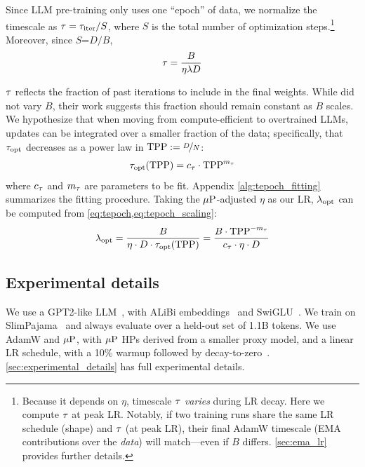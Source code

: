 Since LLM pre-training only uses one ``epoch'' of data, we normalize
the timescale as $\tau = {\tau_\text{iter}}/{S}$, where $S$ is the total
number of optimization steps.\footnote{Because it depends on $\eta$,
timescale $\tau$ \emph{varies} during LR decay. Here we compute
$\tau$ at peak LR\@. Notably, if two training runs share the same
LR schedule (shape) and $\tau$ (at peak LR), their final AdamW
timescale (EMA contributions over the \emph{data}) will match---even
if $B$ differs. \cref{sec:ema_lr} provides further details.}
%
Moreover, since $S$=${D}/{B}$,
\begin{equation}\label{eq:tepoch}
  \tau = \frac{B}{\eta\lambda D}
\end{equation}

$\tau$ reflects the fraction of past iterations to include in the
final weights.
%
While \citet{wang2024how} did not vary $B$, their work suggests this
fraction should remain constant as $B$ scales.
%
We hypothesize that when moving from compute-efficient to overtrained
LLMs, updates can be integrated over a smaller fraction of the data;
specifically, that ${\tau}_{\text{opt}}$ decreases as a power law in $\mathrm{TPP} :=
\nicefrac{D}{N}$:
\begin{equation}\label{eq:tepoch_scaling}
  {\tau}_{\text{opt}}(\mathrm{TPP}) = c_{\tau} \cdot \mathrm{TPP}^{m_{\tau}}
\end{equation}
where $c_{\tau}$ and $m_{\tau}$ are parameters to be fit.
%
%
Appendix \cref{alg:tepoch_fitting} summarizes the fitting procedure.
%
%
Taking the $\mbox{$\mu$P}$-adjusted $\eta$ as our LR, $\lambda_{\text{opt}}$ can be
computed from \cref{eq:tepoch,eq:tepoch_scaling}:
\begin{equation}\label{eq:lambdaopt}
   \lambda_{\text{opt}} = \frac{B}{\eta \cdot D \cdot {\tau}_{\text{opt}}(\mathrm{TPP})}
              = \frac{B \cdot \mathrm{TPP}^{-m_{\tau}}}{c_{\tau} \cdot \eta \cdot D}
\end{equation}

\subsection{Experimental details}\label{sec:lambda_experimental}

We use a GPT2-like LLM~\citep{radford2019gpt2}, with ALiBi
embeddings~\citep{press2022alibi} and SwiGLU~\citep{shazeer2020glu}.
%
We train on SlimPajama~\citep{cerebras2023slimpajama} and always
evaluate over a held-out set of 1.1B tokens.
%
We use AdamW and $\mbox{$\mu$P}$, with $\mbox{$\mu$P}$ HPs derived from a smaller proxy
model, and a linear LR schedule, with a 10\% warmup followed by
decay-to-zero~\citep{bergsma2025straight}.
%
\cref{sec:experimental_details} has full experimental details.

